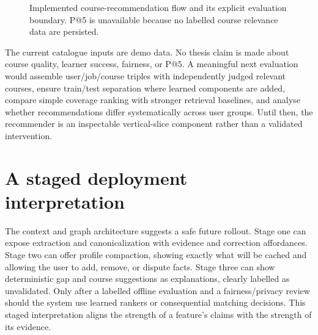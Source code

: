 \begin{figure}[H]
\centering

\caption{Implemented course-recommendation flow and its explicit evaluation boundary. P@5 is unavailable because no labelled course relevance data are persisted.}
\label{fig:course}
\end{figure}

The current catalogue inputs are demo data. No thesis claim is made about course quality, learner success, fairness, or P@5. A meaningful next evaluation would assemble user/job/course triples with independently judged relevant courses, ensure train/test separation where learned components are added, compare simple coverage ranking with stronger retrieval baselines, and analyse whether recommendations differ systematically across user groups. Until then, the recommender is an inspectable vertical-slice component rather than a validated intervention.

\section{A staged deployment interpretation}

The context and graph architecture suggests a safe future rollout. Stage one can expose extraction and canonicalization with evidence and correction affordances. Stage two can offer profile compaction, showing exactly what will be cached and allowing the user to add, remove, or dispute facts. Stage three can show deterministic gap and course suggestions as explanations, clearly labelled as unvalidated. Only after a labelled offline evaluation and a fairness/privacy review should the system use learned rankers or consequential matching decisions. This staged interpretation aligns the strength of a feature's claims with the strength of its evidence.

